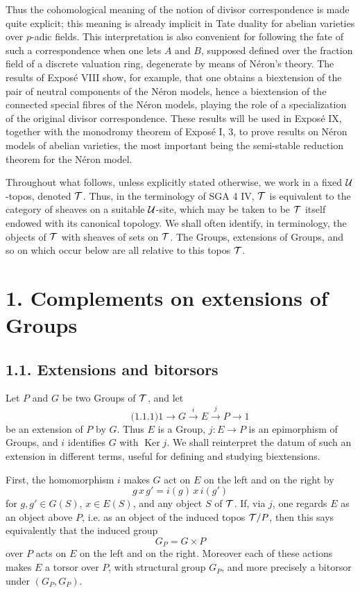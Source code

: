 \documentclass[11pt]{article}
\providecommand{\Ker}{\operatorname{Ker}}
\begin{document}
Thus the cohomological meaning of the notion of divisor correspondence is made quite explicit; this meaning is already implicit in Tate duality for abelian varieties over \(p\)-adic fields.  This interpretation is also convenient for following the fate of such a correspondence when one lets \(A\) and \(B\), supposed defined over the fraction field of a discrete valuation ring, degenerate by means of Néron's theory.  The results of Exposé VIII show, for example, that one obtains a biextension of the pair of neutral components of the Néron models, hence a biextension of the connected special fibres of the Néron models, playing the role of a specialization of the original divisor correspondence.  These results will be used in Exposé IX, together with the monodromy theorem of Exposé I, 3, to prove results on Néron models of abelian varieties, the most important being the semi-stable reduction theorem for the Néron model.

Throughout what follows, unless explicitly stated otherwise, we work in a fixed \(\mathcal U\)-topos, denoted \(\mathcal T\).  Thus, in the terminology of SGA 4 IV, \(\mathcal T\) is equivalent to the category of sheaves on a suitable \(\mathcal U\)-site, which may be taken to be \(\mathcal T\) itself endowed with its canonical topology.  We shall often identify, in terminology, the objects of \(\mathcal T\) with sheaves of sets on \(\mathcal T\).  The Groups, extensions of Groups, and so on which occur below are all relative to this topos \(\mathcal T\).

\section*{1. Complements on extensions of Groups}

\subsection*{1.1. Extensions and bitorsors}

Let \(P\) and \(G\) be two Groups of \(\mathcal T\), and let
\begin{equation}\qquad\text{(1.1.1)}
  1\longrightarrow G\xrightarrow{i}E\xrightarrow{j}P\longrightarrow 1
\end{equation}
be an extension of \(P\) by \(G\).  Thus \(E\) is a Group, \(j:E\to P\) is an epimorphism of Groups, and \(i\) identifies \(G\) with \(\Ker j\).  We shall reinterpret the datum of such an extension in different terms, useful for defining and studying biextensions.

First, the homomorphism \(i\) makes \(G\) act on \(E\) on the left and on the right by
\[
  g\,x\,g'=i(g)\,x\,i(g')
\]
for \(g,g'\in G(S)\), \(x\in E(S)\), and any object \(S\) of \(\mathcal T\).  If, via \(j\), one regards \(E\) as an object above \(P\), i.e. as an object of the induced topos \(\mathcal T/P\), then this says equivalently that the induced group
\[
  G_P=G\times P
\]
over \(P\) acts on \(E\) on the left and on the right.  Moreover each of these actions makes \(E\) a torsor over \(P\), with structural group \(G_P\), and more precisely a bitorsor under \((G_P,G_P)\).
\end{document}
